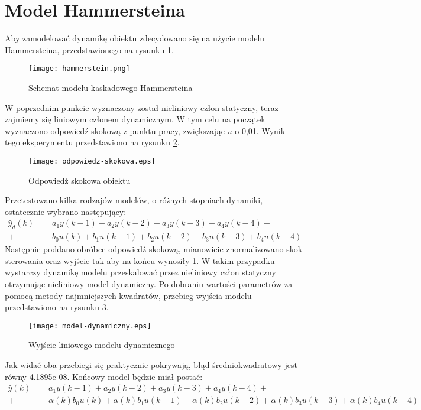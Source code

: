\section{Model Hammersteina}
Aby zamodelować dynamikę obiektu zdecydowano się na użycie modelu Hammersteina, przedstawionego na rysunku \ref{fig:hammerstein}.
\begin{figure}[!h]
	\centering \texttt{[image: hammerstein.png]}
	\caption{Schemat modelu kaskadowego Hammersteina}
	\label{fig:hammerstein}
\end{figure}
W poprzednim punkcie wyznaczony został nieliniowy człon statyczny, teraz zajmiemy się liniowym członem dynamicznym. W tym celu na początek wyznaczono odpowiedź skokową z punktu pracy, zwiększając $u$ o 0,01. Wynik tego eksperymentu przedstawiono na rysunku \ref{fig:odpowiedz-skokowa}.
\begin{figure}[!h]
	\centering \texttt{[image: odpowiedz-skokowa.eps]}
	\caption{Odpowiedź skokowa obiektu}
	\label{fig:odpowiedz-skokowa}
\end{figure}
Przetestowano kilka rodzajów modelów, o różnych stopniach dynamiki, ostatecznie wybrano następujący:
\begin{equation}
\begin{split}
\hat{y}_d(k) = &a_1y(k-1) + a_2y(k-2)+a_3y(k-3)+a_4y(k-4)+ \\
+ &b_0u(k) +b_1u(k-1)+b_2u(k-2)+b_3u(k-3)+b_4u(k-4)
\end{split}
\end{equation}
Następnie poddano obróbce odpowiedź skokową, mianowicie znormalizowano skok sterowania oraz wyjście tak aby na końcu wynosiły 1. W takim przypadku wystarczy dynamikę modelu przeskalować przez nieliniowy człon statyczny otrzymując nieliniowy model dynamiczny. Po dobraniu wartości parametrów za pomocą metody najmniejszych kwadratów, przebieg wyjścia modelu przedstawiono na rysunku \ref{fig:model-dynamiczny}.
\begin{figure}[!h]
	\centering \texttt{[image: model-dynamiczny.eps]}
	\caption{Wyjście liniowego modelu dynamicznego}
	\label{fig:model-dynamiczny}
\end{figure}
Jak widać oba przebiegi się praktycznie pokrywają, błąd średniokwadratowy jest równy 4.1895e-08. Końcowy model będzie miał postać:
\begin{equation}
\begin{split}
\hat{y}(k) = &a_1y(k-1) + a_2y(k-2)+a_3y(k-3)+a_4y(k-4)+ \\
+ &\alpha(k) b_0u(k) +\alpha(k) b_1u(k-1)+\alpha(k) b_2u(k-2)+\alpha(k) b_3u(k-3)+\alpha(k) b_4u(k-4)
\end{split}
\end{equation}
